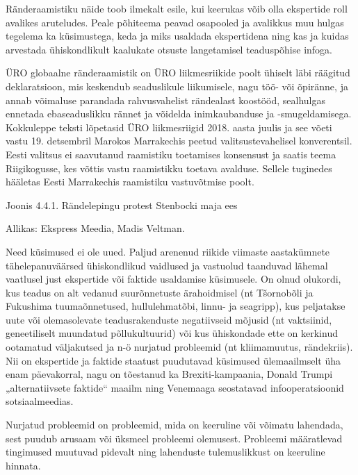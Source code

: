 \documentclass[estonian,]{article}
\begin{document}
Ränderaamistiku näide toob ilmekalt esile, kui keerukas võib olla ekspertide roll avalikes aruteludes. Peale põhiteema peavad osapooled ja avalikkus muu hulgas tegelema ka küsimustega, keda ja miks usaldada ekspertidena ning kas ja kuidas arvestada ühiskondlikult kaalukate otsuste langetamisel teaduspõhise infoga.

\begin{casebox}
ÜRO globaalne ränderaamistik on ÜRO liikmesriikide poolt ühiselt läbi
räägitud deklaratsioon, mis keskendub seaduslikule liikumisele, nagu
töö- või õpiränne, ja annab võimaluse parandada rahvusvahelist
rändealast koostööd, sealhulgas ennetada ebaseaduslikku rännet ja
võidelda inimkaubanduse ja -smugeldamisega. Kokkuleppe teksti lõpetasid
ÜRO liikmesriigid 2018. aasta juulis ja see võeti vastu 19. detsembril
Marokos Marrakechis peetud valitsustevahelisel konverentsil. Eesti
valitsus ei saavutanud raamistiku toetamises konsensust ja saatis teema
Riigikogusse, kes võttis vastu raamistikku toetava avalduse. Sellele
tuginedes hääletas Eesti Marrakechis raamistiku vastuvõtmise poolt.
\end{casebox}

{Joonis 4.4.1.} Rändelepingu protest Stenbocki maja ees

\begin{imgsource}
{Allikas:} Ekspress Meedia, Madis Veltman.
\end{imgsource}

Need küsimused ei ole uued. Paljud arenenud riikide viimaste aastakümnete tähelepanuväärsed ühiskondlikud vaidlused ja vastuolud taanduvad lähemal vaatlusel just ekspertide või faktide usaldamise küsimusele. On olnud olukordi, kus teadus on alt vedanud suurõnnetuste ärahoidmisel (nt Tšornobõli ja Fukushima tuumaõnnetused, hullulehmatõbi, linnu- ja seagripp), kus peljatakse uute või olemasolevate teadusrakenduste negatiivseid mõjusid (nt vaktsiinid, geneetiliselt muundatud põllukultuurid) või kus ühiskondade ette on kerkinud ootamatud väljakutsed ja n-ö nurjatud probleemid (nt kliimamuutus, rändekriis). Nii on ekspertide ja faktide staatust puudutavad küsimused ülemaailmselt üha enam päevakorral, nagu on tõestanud ka Brexiti-kampaania, Donald Trumpi „alternatiivsete faktide`` maailm ning Venemaaga seostatavad infooperatsioonid sotsiaalmeedias.

\begin{blockquote-right}
Nurjatud probleemid on probleemid, mida on keeruline või võimatu
lahendada, sest puudub arusaam või üksmeel probleemi olemusest.
Probleemi määratlevad tingimused muutuvad pidevalt ning lahenduste
tulemuslikkust on keeruline hinnata.
\end{blockquote-right}
\end{document}
